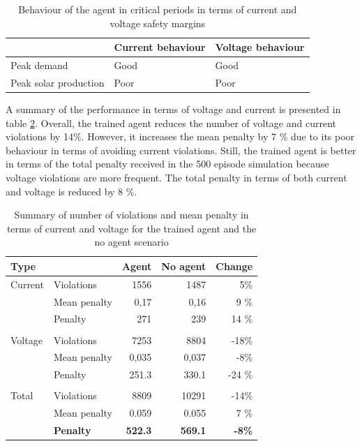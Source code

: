 \documentclass[class=book, crop=false, 11pt]{standalone}
\begin{document}
\begin{table}[h]
\center
\caption{Behaviour of the agent in critical periods in terms of current and voltage safety margins}
\begin{tabular}{l|ll}
                      & Current behaviour     & Voltage behaviour \\
\hline
Peak demand           & Good & Good              \\
Peak solar production & Poor                  & Poor \\
\hline
\end{tabular}
\label{table:results:config1_behaviour}
\end{table}
 A summary of the performance in terms of voltage and current is presented in table \ref{table:results:config1_summary}. Overall, the trained agent reduces the number of voltage and current violations by 14\%. However, it increases the mean penalty by 7 \% due to its poor behaviour in terms of avoiding current violations. Still, the trained agent is better in terms of the total penalty received in the 500 episode simulation because voltage violations are more frequent. The total penalty in terms of both current and voltage is reduced by 8 \%.


\begin{table}[h]
\center
\caption{Summary of number of violations and mean penalty in terms of current and voltage for the trained agent and the no agent scenario}
\begin{tabular}{l|lrrr}
Type      &               & Agent          & No agent       & Change        \\
\hline
Current   & Violations    & 1556            & 1487          & 5\%            \\
          & Mean penalty     & 0,17           & 0,16           & 9 \%         \\
          & Penalty          & 271            & 239            & 14 \%         \\
          &               &                &                &               \\
Voltage   & Violations    & 7253           & 8804           & -18\%          \\
          & Mean  penalty    & 0,035          & 0,037          & -8\%          \\
          & Penalty          & 251.3          & 330.1         & -24 \%        \\
          &               &                &                &               \\
Total     & Violations    & 8809           & 10291          & -14\%          \\
          & Mean penalty     & 0.059          & 0.055          & 7 \%         \\
\textbf{} & \textbf{Penalty} & \textbf{522.3} & \textbf{569.1} & \textbf{-8\%} \\
\hline
\end{tabular}
\label{table:results:config1_summary}
\end{table}
\end{document}
